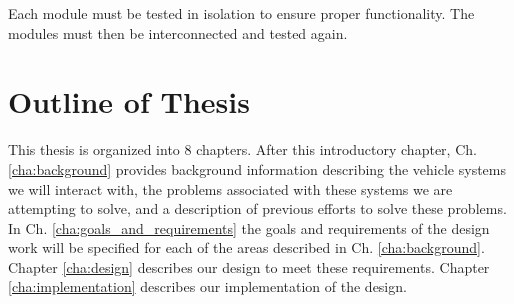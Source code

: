 Each module must be tested in isolation to ensure proper functionality. The modules must then be interconnected and tested again.

\section{Outline of Thesis}

This thesis is organized into 8 chapters. After this introductory chapter, Ch. \ref{cha:background} provides background information describing the vehicle systems we will interact with, the problems associated with these systems we are attempting to solve, and a description of previous efforts to solve these problems. In Ch. \ref{cha:goals_and_requirements} the goals and requirements of the design work will be specified for each of the areas described in Ch. \ref{cha:background}. Chapter \ref{cha:design} describes our design to meet these requirements. Chapter \ref{cha:implementation} describes our implementation of the design.